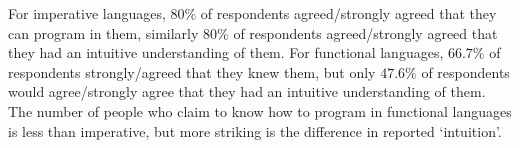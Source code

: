 For imperative languages, $80\%$ of respondents agreed/strongly agreed that they can program in them, similarly $80\%$ of respondents agreed/strongly agreed that they had an intuitive understanding of them. For functional languages, $66.7\%$ of respondents strongly/agreed that they knew them, but only $47.6\%$ of respondents would agree/strongly agree that they had an intuitive understanding of them. The number of people who claim to know how to program in functional languages is less than imperative, but more striking is the difference in reported `intuition'. 